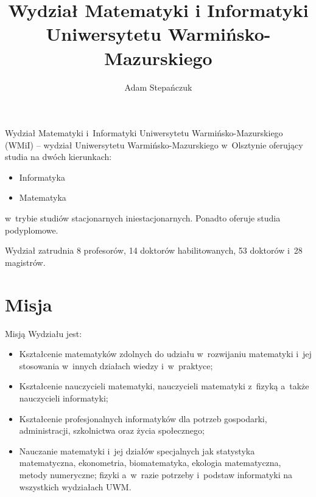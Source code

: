 \documentclass[a4paper,12pt]{article}
\title{Wydział Matematyki i Informatyki Uniwersytetu
Warmińsko-Mazurskiego}
\author{Adam Stepańczuk}
\begin{document}
\maketitle
Wydział Matematyki i~Informatyki Uniwersytetu Warmińsko-Mazurskiego
 (WMiI) – wydział Uniwersytetu Warmińsko-Mazurskiego
 w~Olsztynie oferujący studia na dwóch kierunkach:
\begin{itemize}
\item Informatyka
\item Matematyka
\end{itemize}

w~trybie studiów stacjonarnych iniestacjonarnych. Ponadto oferuje studia podyplomowe.

Wydział zatrudnia 8 profesorów, 14 doktorów habilitowanych, 53 
doktorów i~28 magistrów.
\section{Misja}
 Misją Wydziału jest:
\begin{itemize}
\item Kształcenie matematyków zdolnych do udziału w~rozwijaniu matematyki i~jej stosowania w~innych działach wiedzy i~w~praktyce;
\item Kształcenie nauczycieli matematyki, nauczycieli matematyki z~fizyką a~także nauczycieli informatyki;
\item Kształcenie profesjonalnych informatyków dla potrzeb gospodarki, administracji, szkolnictwa oraz życia
społecznego;
\item Nauczanie matematyki i~jej działów specjalnych jak statystyka matematyczna, ekonometria,
biomatematyka, ekologia matematyczna, metody numeryczne; fizyki a~w~razie potrzeby i~podstaw
informatyki na wszystkich wydziałach UWM.
\end{itemize}
\end{document}

